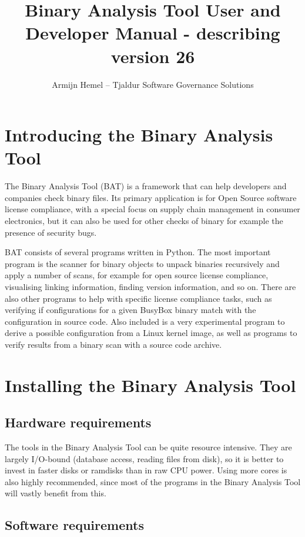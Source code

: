\documentclass[10pt,a4paper]{article}
\author{Armijn Hemel -- Tjaldur Software Governance Solutions}
\title{Binary Analysis Tool User and Developer Manual - describing version 26}
\begin{document}
\maketitle
\thispagestyle{empty}

\tableofcontents

\section{Introducing the Binary Analysis Tool}

The Binary Analysis Tool (BAT) is a framework that can help developers and
companies check binary files. Its primary application is for Open Source
software license compliance, with a special focus on supply chain management
in consumer electronics, but it can also be used for other checks of binary
for example the presence of security bugs.

BAT consists of several programs written in Python. The most important program
is the scanner for binary objects to unpack binaries recursively and apply a
number of scans, for example for open source license compliance, visualising
linking information, finding version information, and so on.  There are also
other programs to help with specific license compliance tasks, such as
verifying if configurations for a given BusyBox binary match with the
configuration in source code. Also included is a very experimental program to
derive a possible configuration from a Linux kernel image, as well as programs
to verify results from a binary scan with a source code archive.

\section{Installing the Binary Analysis Tool}

\subsection{Hardware requirements}

The tools in the Binary Analysis Tool can be quite resource intensive. They
are largely I/O-bound (database access, reading files from disk), so it is
better to invest in faster disks or ramdisks than in raw CPU power. Using more
cores is also highly recommended, since most of the programs in the Binary
Analysis Tool will vastly benefit from this.

\subsection{Software requirements}
\end{document}
